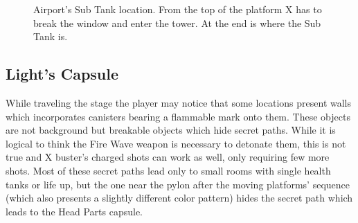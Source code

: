 \begin{figure}[htp]
\begin{subfigure}{0.4\linewidth}
 		\caption{}
 	\end{subfigure}
 	\caption{Airport's Sub Tank location. From the top of the platform X has to break the window and enter the tower. At the end is where the Sub Tank is.}
 \end{figure}
 
\subsection{Light's Capsule} 

 While traveling the stage the player may notice that some locations present walls which incorporates canisters bearing a flammable mark onto them. These objects are not background but breakable objects which hide secret paths. While it is logical to think the Fire Wave weapon is necessary to detonate them, this is not true and X buster's charged shots can work as well, only requiring few more shots. Most of these secret paths lead only to small rooms with single health tanks or life up, but the one near the pylon after the moving platforms' sequence (which also presents a slightly different color pattern) hides the  secret path which leads to the Head Parts capsule. 
